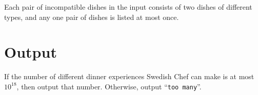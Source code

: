 Each pair of incompatible dishes in the input consists of two dishes of
different types, and any one pair of dishes is listed at most once.

\section*{Output}

If the number of different dinner experiences Swedish Chef can make is
at most $10^{18}$, then output that number.  Otherwise, output
``\texttt{too many}''.
